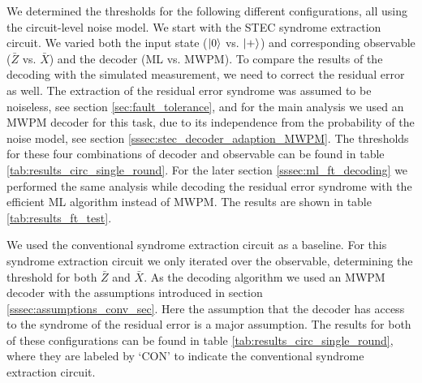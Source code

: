 We determined the thresholds for the following different configurations, all using the circuit-level noise model.
We start with the STEC syndrome extraction circuit. 
We varied both the input state ($\ket{0}$ vs. $\ket{+}$) and corresponding observable ($\bar{Z}$ vs. $\bar{X}$) and the decoder (ML vs. MWPM).
To compare the results of the decoding with the simulated measurement, we need to correct the residual error as well.
The extraction of the residual error syndrome was assumed to be noiseless, see section \ref{sec:fault_tolerance}, 
and for the main analysis we used an MWPM decoder for this task, due to its independence from the probability of the noise model, see section \ref{sssec:stec_decoder_adaption_MWPM}.
The thresholds for these four combinations of decoder and observable can be found in table \ref{tab:results_circ_single_round}.
For the later section \ref{sssec:ml_ft_decoding} we performed the same analysis while decoding the residual error syndrome with the efficient ML algorithm instead of MWPM. 
The results are shown in table \ref{tab:results_ft_test}.

We used the conventional syndrome extraction circuit as a baseline.
For this syndrome extraction circuit we only iterated over the observable, determining the threshold for both $\bar{Z}$ and $\bar{X}$.
As the decoding algorithm we used an MWPM decoder with the assumptions introduced in section \ref{sssec:assumptions_conv_sec}.  
Here the assumption that the decoder has access to the syndrome of the residual error is a major assumption.
The results for both of these configurations can be found in table \ref{tab:results_circ_single_round}, where they are labeled by `CON' to indicate the conventional syndrome extraction circuit.

